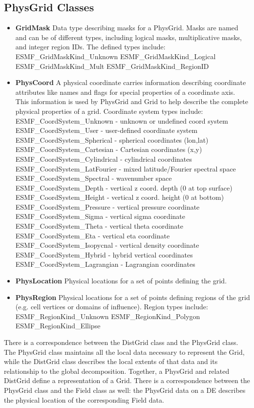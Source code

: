 \subsection{PhysGrid Classes}
\begin{itemize}
\item {\bf GridMask} Data type describing masks for a PhysGrid.  Masks
are named and can be of different types, including logical masks,
multiplicative masks, and integer region IDs.  The defined types include:
   ESMF_GridMaskKind_Unknown
   ESMF_GridMaskKind_Logical
   ESMF_GridMaskKind_Mult
   ESMF_GridMaskKind_RegionID
\item {\bf PhysCoord} A physical coordinate carries information describing
coordinate attributes like names and flags for special properties of a
coordinate axis.  This information is used by PhysGrid and Grid to help
describe the complete physical properties of a grid.  Coordinate system
types include:
   ESMF_CoordSystem_Unknown       - unknown or undefined coord system
   ESMF_CoordSystem_User          - user-defined coordinate system
   ESMF_CoordSystem_Spherical     - spherical coordinates (lon,lat)
   ESMF_CoordSystem_Cartesian     - Cartesian coordinates (x,y)
   ESMF_CoordSystem_Cylindrical   - cylindrical coordinates
   ESMF_CoordSystem_LatFourier    - mixed latitude/Fourier spectral space
   ESMF_CoordSystem_Spectral      - wavenumber space
   ESMF_CoordSystem_Depth         - vertical z coord. depth (0 at top surface)
   ESMF_CoordSystem_Height        - vertical z coord. height (0 at bottom)
   ESMF_CoordSystem_Pressure      - vertical pressure coordinate
   ESMF_CoordSystem_Sigma         - vertical sigma coordinate
   ESMF_CoordSystem_Theta         - vertical theta coordinate
   ESMF_CoordSystem_Eta           - vertical eta coordinate
   ESMF_CoordSystem_Isopycnal     - vertical density coordinate
   ESMF_CoordSystem_Hybrid        - hybrid vertical coordinates
   ESMF_CoordSystem_Lagrangian    - Lagrangian coordinates
\item {\bf PhysLocation} Physical locations for a set of points defining the grid.
\item {\bf PhysRegion} Physical locations for a set of points defining regions of
the grid (e.g. cell vertices or domains of influence).  Region types include:
   ESMF_RegionKind_Unknown
   ESMF_RegionKind_Polygon
   ESMF_RegionKind_Ellipse
\end{itemize}






There is a correspondence between the DistGrid class and the PhysGrid
class.  The PhysGrid class maintains all the local data necessary to
represent the Grid, while the DistGrid class describes the local extents
of that data and its relationship to the global decomposition.
Together, a PhysGrid and related DistGrid define a representation of
a Grid.  There is a correspondence between the PhysGrid class and the Field
class as well:  the PhysGrid data on a DE describes the physical location
of the corresponding Field data.

